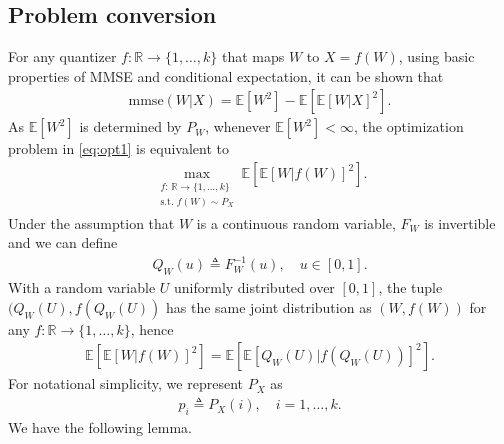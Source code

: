 \documentclass[conference]{IEEEtran}
\newcommand{\R}{\mathbb{R}}
\newcommand{\E}{\mathbb{E}}
\def\deq{\triangleq}
\begin{document}
\subsection{Problem conversion}
For any quantizer $f:\R\rightarrow\{1,\ldots,k\}$ that maps $W$ to $X=f(W)$, using basic properties of MMSE and conditional expectation, it can be shown that
\begin{align}
    \text{mmse}(W|X) = \E[W^2]- \E[\E[W|X]^2] .\label{eq:mmse_decomp}
\end{align}
As $\E[W^2]$ is determined by $P_W$, whenever $\E[W^2] < \infty$, the optimization problem in \eqref{eq:opt1} is equivalent to 
\begin{align}
    \max_{\substack{f:\,\R \rightarrow \{1,\ldots,k\} \\ \text{s.t. } f(W)\sim P_X}} \E[\E[W|f(W)]^2] . \label{eq:max_E[m^2]}
\end{align}
Under the assumption that $W$ is a continuous random variable, $F_W$ is invertible and we can define
\begin{align}
    Q_W(u) \deq F_W^{-1}(u) , \quad u\in[0,1] .
\end{align}
With a random variable $U$ uniformly distributed over $[0,1]$, the tuple $(Q_W(U), f(Q_W(U))$ has the same joint distribution as $(W, f(W))$ for any $f:\R\rightarrow\{1,\ldots,k\}$, hence
\begin{align}
 \E[\E[W|f(W)]^2] = \E[\E[Q_W(U)|f(Q_W(U))]^2] .
\end{align}
For notational simplicity, we represent $P_X$ as
\begin{align}
    p_i \deq P_X(i) , \quad i=1,\ldots,k .
\end{align}
We have the following lemma.
\end{document}
